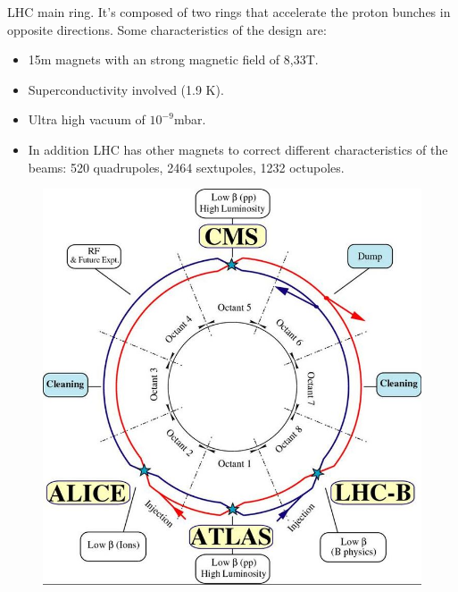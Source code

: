 \documentclass[8pt]{beamer}
\begin{document}
\begin{frame}[fragile]{LHC main ring.}
	It's composed of two rings that accelerate the proton bunches in opposite directions. Some characteristics of the design are:
	\begin{itemize}
		\item 15m magnets with an strong magnetic field of 8,33T. 
		\item Superconductivity involved (1.9 K).
		\item Ultra high vacuum of $10^{-9}$mbar.
		\item In addition LHC has other magnets to correct different characteristics of the beams: 520 quadrupoles, 2464 sextupoles, 1232 octupoles.
	\end{itemize}
	
	\begin{figure}[!tbp]
		\centering
		\begin{minipage}[b]{0.4\textwidth}
			\includegraphics[width=\textwidth]{3}
			

\end{minipage}
\end{figure}
\end{frame}
\end{document}
